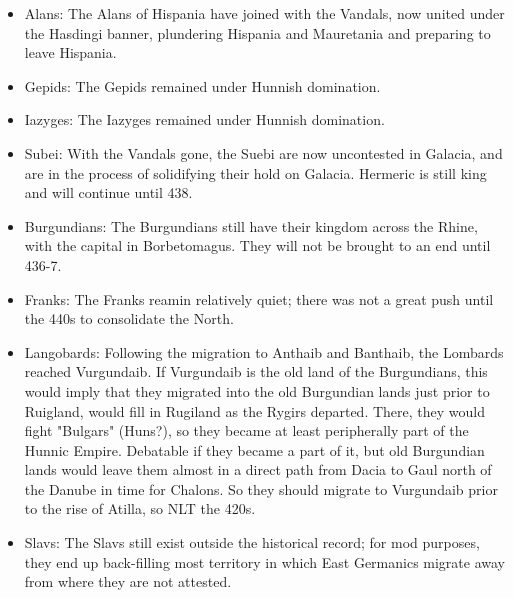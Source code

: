 \documentclass{article}
\begin{document}
\begin{itemize}
		\item Alans:\newline
		The Alans of Hispania have joined with the Vandals, now united under the Hasdingi banner, plundering Hispania and Mauretania and preparing to leave Hispania.
		
		\item Gepids:\newline
		The Gepids remained under Hunnish domination.
		
		\item Iazyges:\newline
		The Iazyges remained under Hunnish domination.
		
		\item Subei:\newline
		With the Vandals gone, the Suebi are now uncontested in Galacia, and are in the process of solidifying their hold on Galacia.
		Hermeric is still king and will continue until 438.
		
		\item Burgundians:\newline
		The Burgundians still have their kingdom across the Rhine, with the capital in Borbetomagus.
		They will not be brought to an end until 436-7.
		
		\item Franks:\newline
		The Franks reamin relatively quiet; there was not a great push until the 440s to consolidate the North.
		
		\item Langobards:\newline
		Following the migration to Anthaib and Banthaib, the Lombards reached Vurgundaib.
		If Vurgundaib is the old land of the Burgundians, this would imply that they migrated into the old Burgundian lands just prior to Ruigland, would fill in Rugiland as the Rygirs departed.
		There, they would fight "Bulgars" (Huns?), so they became at least peripherally part of the Hunnic Empire.
		Debatable if they became a part of it, but old Burgundian lands would leave them almost in a direct path from Dacia to Gaul north of the Danube in time for Chalons.
		So they should migrate to Vurgundaib prior to the rise of Atilla, so NLT the 420s.
		
		\item Slavs:\newline
		The Slavs still exist outside the historical record; for mod purposes, they end up back-filling most territory in which East Germanics migrate away from where they are not attested.
	\end{itemize}
	
\end{document}

